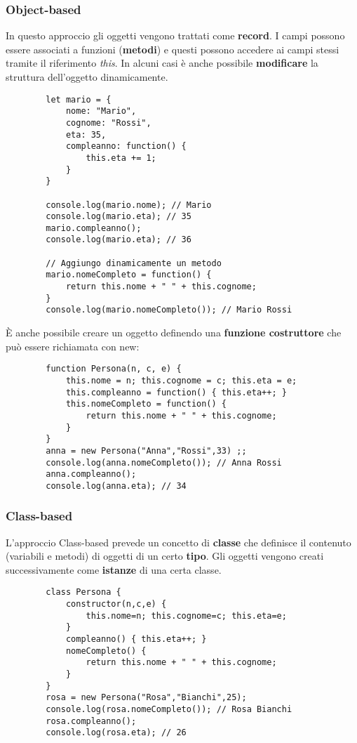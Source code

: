 \subsubsection{Object-based}
In questo approccio gli oggetti vengono trattati come \textbf{record}. I campi possono essere associati a funzioni (\textbf{metodi}) e questi possono accedere ai campi stessi tramite il riferimento \textit{this}. In alcuni casi è anche possibile \textbf{modificare} la struttura dell'oggetto dinamicamente.
\begin{example}
	\begin{lstlisting}
		let mario = {
			nome: "Mario",
			cognome: "Rossi",
			eta: 35,
			compleanno: function() {
				this.eta += 1;
			}
		}
		
		console.log(mario.nome); // Mario
		console.log(mario.eta); // 35
		mario.compleanno();
		console.log(mario.eta); // 36
		
		// Aggiungo dinamicamente un metodo
		mario.nomeCompleto = function() {
			return this.nome + " " + this.cognome;
		}
		console.log(mario.nomeCompleto()); // Mario Rossi
	\end{lstlisting}
\end{example}
È anche possibile creare un oggetto definendo una \textbf{funzione costruttore} che può essere richiamata con new:
\begin{example}[JS Costruttore]
	\begin{lstlisting}
		function Persona(n, c, e) {
			this.nome = n; this.cognome = c; this.eta = e;
			this.compleanno = function() { this.eta++; }
			this.nomeCompleto = function() {
				return this.nome + " " + this.cognome;
			}
		}
		anna = new Persona("Anna","Rossi",33) ;;
		console.log(anna.nomeCompleto()); // Anna Rossi
		anna.compleanno();
		console.log(anna.eta); // 34
	\end{lstlisting}
\end{example}

\subsubsection{Class-based}
L'approccio Class-based prevede un concetto di \textbf{classe} che definisce il contenuto (variabili e metodi) di oggetti di un certo \textbf{tipo}. Gli oggetti vengono creati successivamente come \textbf{istanze} di una certa classe.
\begin{example}
	\begin{lstlisting}
		class Persona {
			constructor(n,c,e) {
				this.nome=n; this.cognome=c; this.eta=e;
			}
			compleanno() { this.eta++; }
			nomeCompleto() {
				return this.nome + " " + this.cognome;
			}
		}
		rosa = new Persona("Rosa","Bianchi",25);
		console.log(rosa.nomeCompleto()); // Rosa Bianchi
		rosa.compleanno();
		console.log(rosa.eta); // 26
	\end{lstlisting}
\end{example}

